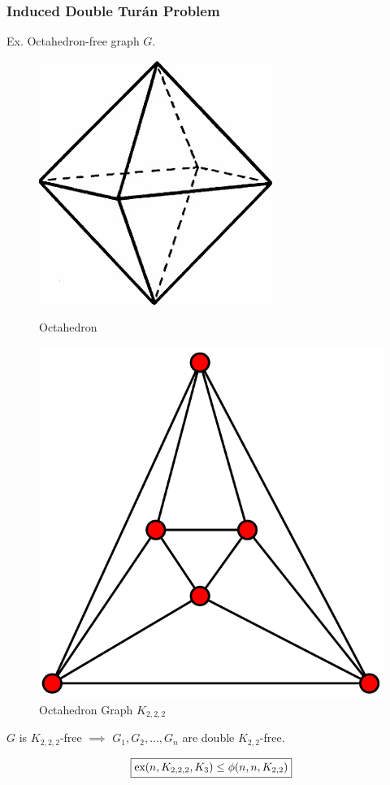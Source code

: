 \documentclass{beamer}
\newcommand*{\ex}{\textnormal{ex}}
\begin{document}
\begin{frame}
  \frametitle{Induced Double Turán Problem}

  Ex. Octahedron-free graph $G$.

  \begin{figure}
    \begin{minipage}{0.48\textwidth}
      \centering
      \includegraphics[width=0.45\linewidth]{oct}
      \caption{Octahedron}
    \end{minipage}
    \hfill
    \begin{minipage}{0.48\textwidth}
      \centering
      \includegraphics[width=0.45\linewidth]{Octahedron_graph}
      \caption{Octahedron Graph $K_{2,2,2}$}
    \end{minipage}
  \end{figure}

  \pause

  \vspace{0.1cm}

  \begin{center}
    $G$ is $K_{2,2,2}$-free $\implies$ $G_1, G_2, \ldots, G_n$ are double $K_{2, 2}$-free.
  \end{center}

  \pause

  \[
    \boxed{\ex(n, K_{2,2,2}, K_3) \leq \phi(n, n, K_{2,2})}
  \]
\end{frame}
\end{document}
